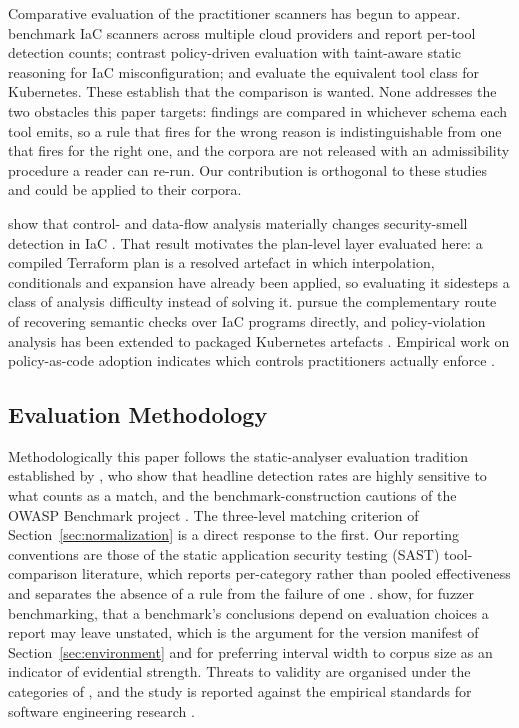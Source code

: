 \documentclass[smallextended]{svjour3}
\begin{document}
Comparative evaluation of the practitioner scanners has begun to appear.
\citet{roe2026multicloud} benchmark IaC scanners across multiple cloud providers
and report per-tool detection counts; \citet{gokhale2026comparative} contrast
policy-driven evaluation with taint-aware static reasoning for IaC
misconfiguration; and \citet{kapetanidou2025k8s} evaluate the equivalent tool
class for Kubernetes. These establish that the comparison is wanted. None
addresses the two obstacles this paper targets: findings are compared in
whichever schema each tool emits, so a rule that fires for the wrong reason is
indistinguishable from one that fires for the right one, and the corpora are not
released with an admissibility procedure a reader can re-run. Our contribution is
orthogonal to these studies and could be applied to their corpora.

\citet{opdebeeck2023control} show that control- and data-flow analysis materially
changes security-smell detection in IaC \citep[see also][]{opdebeeck2022smelly}.
That result motivates the plan-level layer evaluated here: a compiled Terraform
plan is a resolved artefact in which interpolation, conditionals and expansion
have already been applied, so evaluating it sidesteps a class of analysis
difficulty instead of solving it. \citet{qiu2024semantic} pursue the
complementary route of recovering semantic checks over IaC programs directly, and
policy-violation analysis has been extended to packaged Kubernetes artefacts
\citep{minna2026helm}. Empirical work on policy-as-code adoption indicates which
controls practitioners actually enforce \citep{foalem2026pac}.

\subsection{Evaluation Methodology}
Methodologically this paper follows the static-analyser evaluation tradition
established by \citet{habib2018howmany}, who show that headline detection rates
are highly sensitive to what counts as a match, and the benchmark-construction
cautions of the OWASP Benchmark project \citep{owasp2023benchmark}. The
three-level matching criterion of Section~\ref{sec:normalization} is a direct
response to the first. Our reporting conventions are those of the static application security testing
(SAST) tool-comparison literature, which reports per-category rather than pooled
effectiveness and separates the absence of a rule from the failure of one
\citep{li2023sast, esposito2024extensive}. \citet{bohme2022reliability}
show, for fuzzer benchmarking, that a benchmark's conclusions depend on evaluation
choices a report may leave unstated, which is the argument for the version
manifest of Section~\ref{sec:environment} and for preferring interval width to
corpus size as an indicator of evidential strength. Threats to validity are
organised under the categories of \citet{wohlin2012experimentation}, and the
study is reported against the empirical standards for software engineering
research \citep{ralph2021standards, hasselbring2021benchmarking}.
\end{document}
